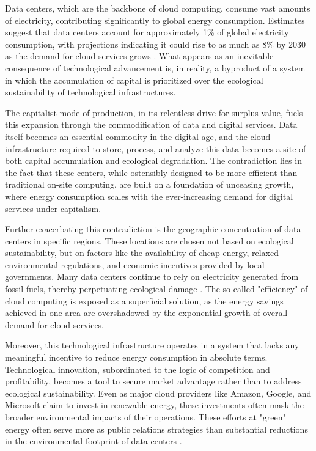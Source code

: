 Data centers, which are the backbone of cloud computing, consume vast amounts of electricity, contributing significantly to global energy consumption. Estimates suggest that data centers account for approximately 1\% of global electricity consumption, with projections indicating it could rise to as much as 8\% by 2030 as the demand for cloud services grows \cite[pp.~163-165]{jones2018}. What appears as an inevitable consequence of technological advancement is, in reality, a byproduct of a system in which the accumulation of capital is prioritized over the ecological sustainability of technological infrastructures.

The capitalist mode of production, in its relentless drive for surplus value, fuels this expansion through the commodification of data and digital services. Data itself becomes an essential commodity in the digital age, and the cloud infrastructure required to store, process, and analyze this data becomes a site of both capital accumulation and ecological degradation. The contradiction lies in the fact that these centers, while ostensibly designed to be more efficient than traditional on-site computing, are built on a foundation of unceasing growth, where energy consumption scales with the ever-increasing demand for digital services under capitalism.

Further exacerbating this contradiction is the geographic concentration of data centers in specific regions. These locations are chosen not based on ecological sustainability, but on factors like the availability of cheap energy, relaxed environmental regulations, and economic incentives provided by local governments. Many data centers continue to rely on electricity generated from fossil fuels, thereby perpetuating ecological damage \cite[pp.~156-158]{coroama2013}. The so-called "efficiency" of cloud computing is exposed as a superficial solution, as the energy savings achieved in one area are overshadowed by the exponential growth of overall demand for cloud services.

Moreover, this technological infrastructure operates in a system that lacks any meaningful incentive to reduce energy consumption in absolute terms. Technological innovation, subordinated to the logic of competition and profitability, becomes a tool to secure market advantage rather than to address ecological sustainability. Even as major cloud providers like Amazon, Google, and Microsoft claim to invest in renewable energy, these investments often mask the broader environmental impacts of their operations. These efforts at "green" energy often serve more as public relations strategies than substantial reductions in the environmental footprint of data centers \cite[pp.~280-282]{smil2018}.

